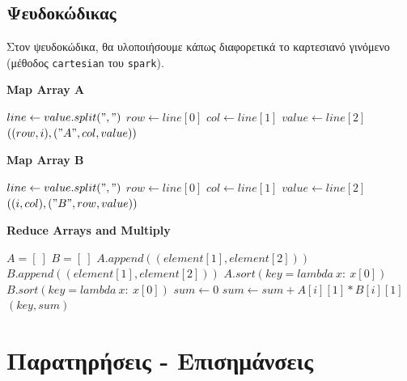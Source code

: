 \documentclass{ntua}
\begin{document}
\subsection{Ψευδοκώδικας}

Στον ψευδοκώδικα, θα υλοποιήσουμε κάπως διαφορετικά το καρτεσιανό γινόμενο (μέθοδος \texttt{cartesian} του \texttt{spark}).

\begin{algorithm}[H]
\caption*{\bfseries{Map Array A}}
\begin{algorithmic}[1]
	\State $line \gets value.split(",")$
	\State $row \gets line[0]$
	\State $col \gets line[1]$
	\State $value \gets line[2]$
		\Emit $((row, i), ("A", col, value))$
	\EndFor
	\EndFunction
\end{algorithmic}
\end{algorithm}

\begin{algorithm}[H]
\caption*{\bfseries{Map Array B}}
\begin{algorithmic}[1]
	\State $line \gets value.split(",")$
	\State $row \gets line[0]$
	\State $col \gets line[1]$
	\State $value \gets line[2]$
	\Emit $((i, col), ("B", row, value))$
	\EndFor
	\EndFunction
\end{algorithmic}
\end{algorithm}

\begin{algorithm}[H]
\caption*{\bfseries{Reduce Arrays and Multiply}}
\begin{algorithmic}[1]
	\State $A = [\ ]$
	\State $B = [\ ]$
			\State $A.append((element[1], element[2]))$
		\Else
			\State $B.append((element[1], element[2]))$
		\EndIf
	\EndFor
	\State $A.sort(key=lambda\ x:\ x[0])$
	\State $B.sort(key=lambda\ x:\ x[0])$
	\State $sum \gets 0$
		\State $sum \gets sum + A[i][1] * B[i][1]$
	\EndFor
	\Emit $(key, sum)$
	\EndFunction
\end{algorithmic}
\end{algorithm}

\newpage

\section{Παρατηρήσεις - Επισημάνσεις}
\end{document}
